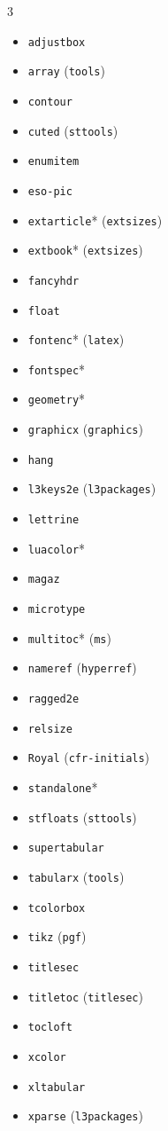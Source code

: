 		{\footnotesize
			\begin{multicols}{3}
				\begin{itemize}[nosep, label={}, leftmargin=0pt]
					\item \texttt{adjustbox}
					\item \texttt{array} (\texttt{tools})
					\item \texttt{contour}
					\item \texttt{cuted} (\texttt{sttools})
					\item \texttt{enumitem}
					\item \texttt{eso-pic}
					\item \texttt{extarticle}* (\texttt{extsizes})
					\item \texttt{extbook}* (\texttt{extsizes})
					\item \texttt{fancyhdr}
					\item \texttt{float}
					\item \texttt{fontenc}* (\texttt{latex})
					\item \texttt{fontspec}*
					\item \texttt{geometry}*
					\item \texttt{graphicx} (\texttt{graphics})
					\item \texttt{hang}
					\item \texttt{l3keys2e} (\texttt{l3packages})
					\item \texttt{lettrine}
					\item \texttt{luacolor}*
					\item \texttt{magaz}
					\item \texttt{microtype}
					\item \texttt{multitoc}* (\texttt{ms})
					\item \texttt{nameref} (\texttt{hyperref})
					\item \texttt{ragged2e}
					\item \texttt{relsize}
					\item \texttt{Royal} (\texttt{cfr-initials})
					\item \texttt{standalone}*
					\item \texttt{stfloats} (\texttt{sttools})
					\item \texttt{supertabular}
					\item \texttt{tabularx} (\texttt{tools})
					\item \texttt{tcolorbox}
					\item \texttt{tikz} (\texttt{pgf})
					\item \texttt{titlesec}
					\item \texttt{titletoc} (\texttt{titlesec})
					\item \texttt{tocloft}
					\item \texttt{xcolor}
					\item \texttt{xltabular}
					\item \texttt{xparse} (\texttt{l3packages})
				\end{itemize}
			\end{multicols}
		}

